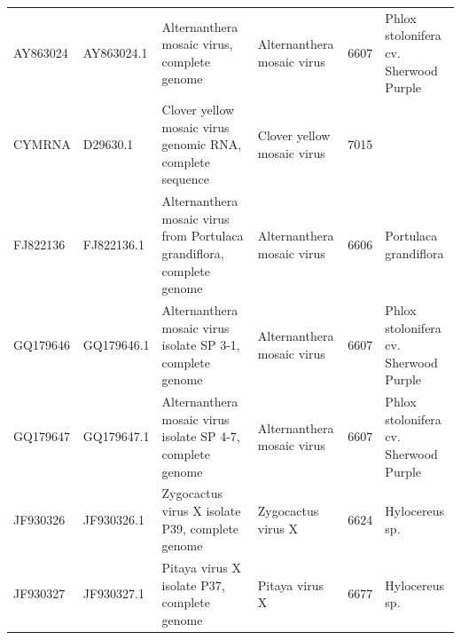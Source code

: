 \documentclass[11pt]{article}
\begin{document}
\begin{supptable}[ht]
{\begin{tabular}{llllll}
AY863024 & AY863024.1 & Alternanthera mosaic virus, complete genome                                                                                                                                                                                                                      & Alternanthera mosaic virus     & 6607            & Phlox stolonifera cv. Sherwood Purple \\
CYMRNA   & D29630.1   & Clover yellow mosaic virus genomic RNA, complete sequence                                                                                                                                                                                                        & Clover yellow mosaic virus     & 7015            &                                       \\
FJ822136 & FJ822136.1 & Alternanthera mosaic virus from Portulaca grandiflora, complete genome                                                                                                                                                                                           & Alternanthera mosaic virus     & 6606            & Portulaca grandiflora                 \\
GQ179646 & GQ179646.1 & Alternanthera mosaic virus isolate SP 3-1, complete genome                                                                                                                                                                                                       & Alternanthera mosaic virus     & 6607            & Phlox stolonifera cv. Sherwood Purple \\
GQ179647 & GQ179647.1 & Alternanthera mosaic virus isolate SP 4-7, complete genome                                                                                                                                                                                                       & Alternanthera mosaic virus     & 6607            & Phlox stolonifera cv. Sherwood Purple \\
JF930326 & JF930326.1 & Zygocactus virus X isolate P39, complete genome                                                                                                                                                                                                                  & Zygocactus virus X             & 6624            & Hylocereus sp.                        \\
JF930327 & JF930327.1 & Pitaya virus X isolate P37, complete genome                                                                                                                                                                                                                      & Pitaya virus X                 & 6677            & Hylocereus sp.                        \\

\end{tabular}}
\end{supptable}
\end{document}
